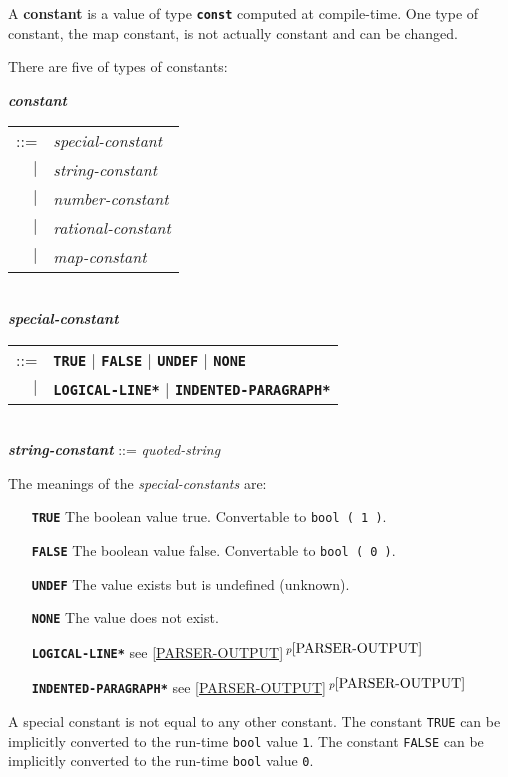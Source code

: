 \documentclass[12pt]{article}
\newcommand{\TT}[1]{{\tt \bfseries #1}}
\newcommand{\key}[1]{{\rm \bfseries #1}}
\newcommand{\ttkey}[1]{{\tt \bfseries #1}}
\newcommand{\emkey}[1]{{\em \bfseries #1}}
\newcommand{\itemref}[1]{\ref{#1}$\,^{p\pageref{#1}}$}
\newenvironment{indpar}[1][0.3in]%
	{\begin{list}{}%
		     {\setlength{\itemsep}{0in}%
		      \setlength{\topsep}{0in}%
		      \setlength{\parsep}{1ex}%
		      \setlength{\labelwidth}{#1}%
		      \setlength{\leftmargin}{#1}%
		      \addtolength{\leftmargin}{\labelsep}}%
	 \item}%
	{\end{list}}
\begin{document}
A \key{constant} is a value of type \ttkey{const} computed at
compile-time.  One type of constant, the map constant, is not
actually constant and can be changed.

There are five of types of constants:

\begin{indpar}
\emkey{constant}\label{CONSTANT}
    \begin{tabular}[t]{rl}
    ::= & {\em special-constant} \\
    $|$ & {\em string-constant} \\
    $|$ & {\em number-constant} \\
    $|$ & {\em rational-constant} \\
    $|$ & {\em map-constant} \\
    \end{tabular} \\
\emkey{special-constant} 
    \begin{tabular}[t]{@{}rl}
    ::= & \ttkey{TRUE} $|$ \ttkey{FALSE}
                       $|$ \ttkey{UNDEF} $|$ \ttkey{NONE} \\
    $|$ & \ttkey{*LOGICAL-LINE*} $|$ \ttkey{*INDENTED-PARAGRAPH*} \\
    \end{tabular} \\
\emkey{string-constant} ::= {\em quoted-string}
\end{indpar}

The meanings of the {\em special-constants} are:
\begin{indpar}[1.6in]
\begin{itemize}
\item[\TT{TRUE}] The boolean value true.  Convertable to {\tt bool ( 1 )}.
\item[\TT{FALSE}] The boolean value false.  Convertable to {\tt bool ( 0 )}.
\item[\TT{UNDEF}] The value exists but is undefined (unknown).
\item[\TT{NONE}] The value does not exist.
\item[\TT{*LOGICAL-LINE*}] see \itemref{PARSER-OUTPUT}
\item[\TT{*INDENTED-PARAGRAPH*}] see \itemref{PARSER-OUTPUT}
\end{itemize}
\end{indpar}
A special constant is not equal to any other constant.
The constant {\tt TRUE} can be implicitly converted to the
run-time {\tt bool} value {\tt 1}.
The constant {\tt FALSE} can be implicitly converted to the
run-time {\tt bool} value {\tt 0}.
\end{document}
